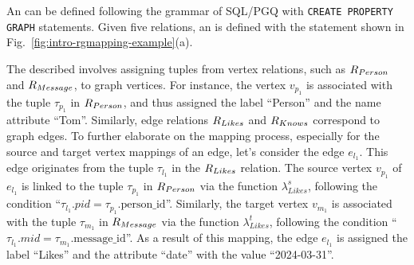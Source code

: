 \begin{example}
    \label{ex:rgmapping}
    An \rgmapping can be defined following the grammar of SQL/PGQ with \lstinline{CREATE PROPERTY GRAPH} statements.
    Given five relations, an \rgmapping is defined with the statement shown in Fig.~\ref{fig:intro-rgmapping-example}(a).

    The described \rgmapping involves assigning tuples from vertex relations, such as ${R_{Person}}$ and ${R_{Message}}$, to graph vertices. For instance, the vertex $v_{p_1}$ is associated with the tuple $\tau_{p_1}$ in ${R_{Person}}$, and thus assigned the label ``Person'' and the name attribute ``Tom''. Similarly, edge relations ${R_{Likes}}$ and ${R_{Knows}}$ correspond to graph edges.
    To further elaborate on the mapping process, especially for the source and target vertex mappings of an edge, let's consider the edge $e_{l_1}$. This edge originates from the tuple $\tau_{l_1}$ in the ${R_{Likes}}$ relation. The source vertex $v_{p_1}$ of $e_{l_1}$ is linked to the tuple $\tau_{p_1}$ in ${R_{Person}}$ via the function $\lambda_{Likes}^s$, following the condition ``$\tau_{l_1}.pid = \tau_{p_1}.\text{person\_id}$''. Similarly, the target vertex $v_{m_1}$ is associated with the tuple $\tau_{m_1}$ in ${R_{Message}}$ via the function $\lambda_{Likes}^t$, following the condition ``$\tau_{l_1}.mid = \tau_{m_1}.\text{message\_id}$''. As a result of this mapping, the edge $e_{l_1}$ is assigned the label ``Likes'' and the attribute ``date'' with the value ``2024-03-31''.
\end{example}

